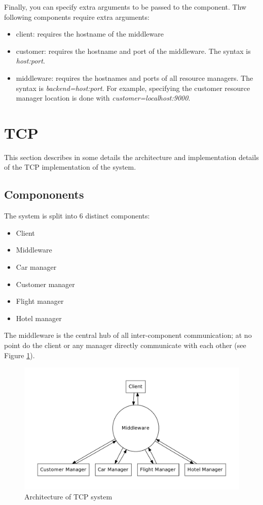 \documentclass[11pt]{article}
\begin{document}
Finally, you can specify extra arguments to be passed to the
component.  Thw following components require extra arguments:

\begin{itemize}
\item client: requires the hostname of the middleware
\item customer: requires the hostname and port of the middleware.  The
  syntax is {\it host:port}.
\item middleware: requires the hostnames and ports of all resource
  managers.  The syntax is {\it backend=host:port}.  For example,
  specifying the customer resource manager location is done with {\it
    customer=localhost:9000}.
\end{itemize}




\section{TCP}

This section describes in some details the architecture and
implementation details of the TCP implementation of the system.


\subsection{Compononents}

The system is split into 6 distinct components:

\begin{itemize}
\item Client
\item Middleware
\item Car manager
\item Customer manager
\item Flight manager
\item Hotel manager
\end{itemize}

The middleware is the central hub of all inter-component
communication; at no point do the client or any manager directly
communicate with each other (see Figure \ref{fig:tcp}).


\begin{figure}[h]
  \begin{center}
    \caption{Architecture of TCP system \label{fig:tcp} }
    \includegraphics[scale=0.4]{tcp-diagram.pdf}
  \end{center}
\end{figure}
\end{document}
